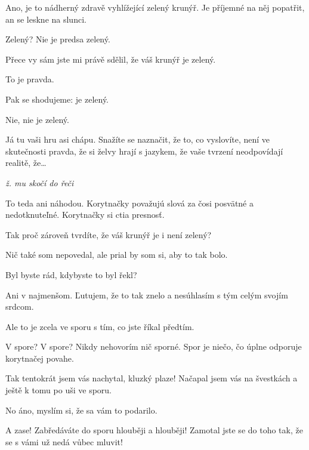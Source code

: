 \documentclass[12pt]{article}
\begin{document}
\begin{description}[itemsep=0pt]
\item[A:] Ano, je to nádherný zdravě vyhlížející zelený krunýř. Je příjemné
    na něj popatřit, an se leskne na slunci.

\item[Ž:] Zelený? Nie je predsa zelený.

\item[A:] Přece vy sám jste mi právě sdělil, že váš krunýř je zelený.

\item[Ž:] To je pravda.

\item[A:] Pak se shodujeme: je zelený.

\item[Ž:] Nie, nie je zelený.

\item[A:] Já tu vaši hru asi chápu. Snažíte se naznačit, že to, co vyslovíte,
    není ve skutečnosti pravda, že si želvy hrají s jazykem, že vaše tvrzení neodpovídají
    realitě, že…

\textit{ž. mu skočí do řeči}
\item[Ž:] To teda ani náhodou. Korytnačky považujú slová za čosi posvätné a nedotknuteľné. Korytnačky si ctia presnosť.

\item[A::] Tak proč zároveň tvrdíte, že váš krunýř je i není zelený?

\item[Ž:] Nič také som nepovedal, ale prial by som si, aby to tak bolo.

\item[A:] Byl byste rád, kdybyste to byl řekl?

\item[Ž:] Ani v najmenšom. Ľutujem, že to tak znelo a nesúhlasím s tým celým svojím srdcom.

\item[A:] Ale to je zcela ve sporu s tím, co jste říkal předtím.

\item[Ž:] V spore? V spore? Nikdy nehovorím nič sporné. Spor je niečo, čo úplne odporuje korytnačej povahe.

\item[A:] Tak tentokrát jsem vás nachytal, kluzký plaze! Načapal jsem vás na švestkách
    a ještě k tomu po uši ve sporu.

\item[Ž:] No áno, myslím si, že sa vám to podarilo.

\item[A:] A zase! Zabředáváte do sporu hlouběji a hlouběji! Zamotal jste  se do toho
    tak, že se s vámi už nedá vůbec mluvit!


\end{description}
\end{document}
